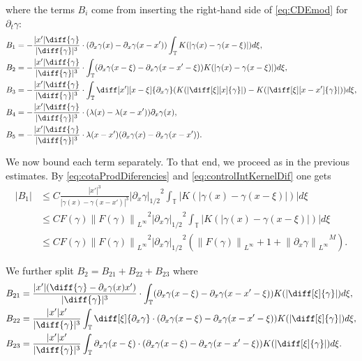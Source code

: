 \documentclass[a4paper]{amsart}
\theoremstyle{definition}
\newcommand{\T}{\ensuremath{\mathbb{T}}}
\newcommand{\SNa}[2][\gamma]{\ensuremath{\left|#2\right|_{#1}}}
\newcommand{\Np}[2][\infty]{\ensuremath{\left\|#2\right\|_{L^#1}}}
\newcommand{\intT}{\ensuremath{\int_\T}}
\begin{document}
         where the terms \(B_i\) come from inserting the right‑hand side of \eqref{eq:CDEmod} for \(\partial_t\gamma\):
        \begin{align*}
            B_1&= -\frac{|x'|\diff{\gamma}}{|\diff{\gamma}|^3}\cdot (\partial_x\gamma(x)-\partial_x\gamma(x-x')) \intT K(|\gamma(x)-\gamma(x-\xi)|)d\xi,\\
            B_2&=-\frac{|x'|\diff{\gamma}}{|\diff{\gamma}|^3}\cdot\intT (\partial_x\gamma(x-\xi)-\partial_x\gamma (x-x'-\xi)) K(|\gamma(x)-\gamma(x-\xi)|)d\xi,\\
            B_3&=-\frac{|x'|\diff{\gamma}}{|\diff{\gamma}|^3}\cdot \intT \diff[x'][x-\xi]{\partial_x\gamma} (K(|\diff[\xi][x]{\gamma}|)-K(|\diff[\xi][x-x']{\gamma}|)) d\xi,\\
            B_4&=-\frac{|x'|\diff{\gamma}}{|\diff{\gamma}|^3}\cdot (\lambda(x)-\lambda(x-x'))\partial_x\gamma(x),\\
            B_5&=-\frac{|x'|\diff{\gamma}}{|\diff{\gamma}|^3}\cdot\lambda(x-x')(\partial_x\gamma(x)-\partial_x\gamma(x-x')).
        \end{align*}

        We now bound each term separately. To that end, we proceed as in the previous estimates. By \eqref{eq:cotaProdDiferencies} and \eqref{eq:controlIntKernelDif} one gets
        \begin{align*}
        |B_1|&\leq C \frac{|x'|^3}{|\gamma(x)-\gamma(x-x')|^3}\SNa[1/2]{\partial_x\gamma}^2  \intT |K(|\gamma(x)-\gamma(x-\xi)|)|d\xi\\ 
        &\leq C F(\gamma) \Np{F(\gamma)}^2 \SNa[1/2]{\partial_x\gamma}^2 \intT |K(|\gamma(x)-\gamma(x-\xi)|)|d\xi\\
        &\leq C F(\gamma) \Np{F(\gamma)}^2 \SNa[1/2]{\partial_x\gamma}^2\left( \Np{F(\gamma)} + 1 + \Np{\partial_x\gamma}^M \right).
        \end{align*}

        We further split $B_2=B_{21}+B_{22}+B_{23}$ where
        \begin{align*}
            B_{21}&=\frac{|x'|(\diff{\gamma}-\partial_x\gamma(x)x')}{|\diff{\gamma}|^3}\cdot\intT (\partial_x\gamma(x-\xi)-\partial_x\gamma(x-x'-\xi))K(|\diff[\xi]{\gamma}|) d\xi, \\
            B_{22}&=\frac{|x'|x'}{|\diff{\gamma}|^3}\intT \diff[\xi]{\partial_x\gamma}\cdot(\partial_x\gamma(x-\xi)-\partial_x\gamma(x-x'-\xi))K(|\diff[\xi]{\gamma}|) d\xi, \\
            B_{23}&=\frac{|x'|x'}{|\diff{\gamma}|^3}\intT \partial_x\gamma(x-\xi)\cdot(\partial_x\gamma(x-\xi)-\partial_x\gamma(x-x'-\xi))K(|\diff[\xi]{\gamma}|) d\xi.
        \end{align*}
\end{document}
